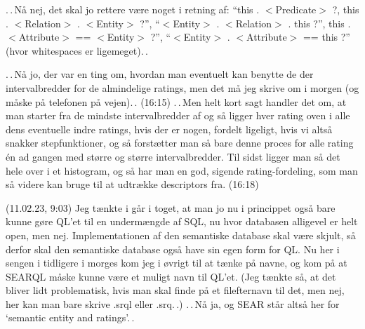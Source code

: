\documentclass{report}
\begin{document}
.\,.\,Nå nej, det skal jo rettere være noget i retning af: ``this . $<$Predicate$>$ ?, this . $<$Relation$>$ . $<$Entity$>$ ?'', ``$<$Entity$>$ . $<$Relation$>$ . this ?'', this . $<$Attribute$>$ == $<$Entity$>$ ?'', ``$<$Entity$>$ . $<$Attribute$>$ == this ?'' (hvor whitespaces er ligemeget).\,. 

.\,.\,Nå jo, der var en ting om, hvordan man eventuelt kan benytte de der intervalbredder for de almindelige ratings, men det må jeg skrive om i morgen (og måske på telefonen på vejen).\,. (16:15) .\,.\,Men helt kort sagt handler det om, at man starter fra de mindste intervalbredder af og så ligger hver rating oven i alle dens eventuelle indre ratings, hvis der er nogen, fordelt ligeligt, hvis vi altså snakker stepfunktioner, og så forstætter man så bare denne proces for alle rating én ad gangen med større og større intervalbredder. Til sidst ligger man så det hele over i et histogram, og så har man en god, sigende rating-fordeling, som man så videre kan bruge til at udtrække descriptors fra. (16:18)

%

(11.02.23, 9:03) Jeg tænkte i går i toget, at man jo nu i princippet også bare kunne gøre QL'et til en undermængde af SQL, nu hvor databasen alligevel er helt open, men nej. Implementationen af den semantiske database skal være skjult, så derfor skal den semantiske database også have sin egen form for QL. Nu her i sengen i tidligere i morges kom jeg i øvrigt til at tænke på navne, og kom på at SEARQL måske kunne være et muligt navn til QL'et. (Jeg tænkte så, at det bliver lidt problematisk, hvis man skal finde på et filefternavn til det, men nej, her kan man bare skrive .srql eller .srq.\,.) .\,.\,Nå ja, og SEAR står altså her for `semantic entity and ratings'.\,. 
\end{document}
